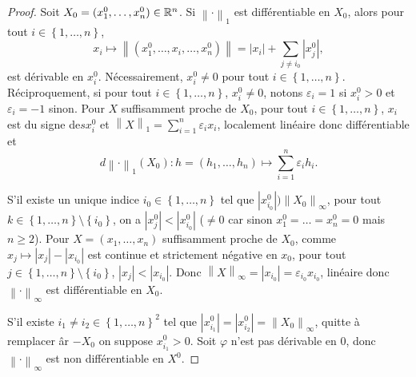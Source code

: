 \documentclass[12pt]{article}
\begin{document}
\begin{proof}
	Soit $X_0=(x_{1}^{0},\dots,x_{n}^{0})\in\mathbb{R}^{n}$. Si $\left\lVert\cdot\right\rVert_{1}$ est différentiable en $X_0$, alors pour tout $i\in\left\lbrace1,\dots,n\right\rbrace$, 
	\begin{equation}
		x_i\mapsto \left\lVert(x_1^{0},\dots,x_i,\dots,x_n^{0})\right\rVert=\left\lvert x_i\right\rvert+\sum_{j\neq i_0}\left\lvert x_j^{0}\right\rvert,
	\end{equation}
	est dérivable en $x_{i}^{0}$. Nécessairement, $x_{i}^{0}\neq0$ pour tout $i\in\left\lbrace1,\dots,n\right\rbrace$.
	Réciproquement, si pour tout $i\in\left\lbrace1,\dots,n\right\rbrace$, $x_{i}^{0}\neq0$, notons $\varepsilon_{i}=1$ si $x_i^{0}>0$ et $\varepsilon_i=-1$ sinon. Pour $X$ suffisamment proche de $X_0$, pour tout $i\in\left\lbrace1,\dots,n\right\rbrace$, $x_i$ est du signe de$ sx_{i}^{0}$ et $\left\lVert X\right\rVert_{1}=\sum_{i=1}^{n}\varepsilon_{i}x_{i}$, localement linéaire donc différentiable et 
	\begin{equation}
		d\left\lVert \cdot\right\rVert_{1}(X_0)\colon h=(h_1,\dots,h_n)\mapsto\sum_{i=1}^{n}\varepsilon_{i}h_i.
	\end{equation}

	S'il existe un unique indice $i_{0}\in\left\lbrace 1,\dots,n\right\rbrace$ tel que $\left\lvert x_{i_{0}}^{0}\right\rvert)\left\lVert X_0\right\rVert_{\infty}$, pour tout $k\in\left\lbrace1,\dots,n\right\rbrace\setminus\left\lbrace i_0\right\rbrace$, on a $\left\lvert x_j^{0}\right\rvert<\left\lvert x_{i_0}^{0}\right\rvert$ ($\neq0$ car sinon $x_1^{0}=\dots=x_n^{0}=0$ mais $n\geqslant2$). Pour $X=(x_1,\dots,x_n)$ suffisamment proche de $X_0$, comme $x_j\mapsto\left\lvert x_j\right\rvert-\left\lvert x_{i_{0}}\right\rvert$ est continue et strictement négative en $x_{0}$, pour tout $j\in\left\lbrace1,\dots,n\right\rbrace\setminus\left\lbrace i_0\right\rbrace$, $\left\lvert x_j\right\rvert<\left\lvert x_{i_0}\right\rvert$. Donc $\left\lVert X\right\rVert_{\infty}=\left\lvert x_{i_0}\right\rvert=\varepsilon_{i_0}x_{i_0}$, linéaire donc $\left\lVert \cdot\right\rVert_{\infty}$ est différentiable en $X_0$.

	S'il existe $i_1\neq i_2\in\left\lbrace 1,\dots,n\right\rbrace^{2}$ tel que $\left\lvert x_{i_{1}}^{0}\right\rvert=\left\lvert x_{i_{2}}^{0}\right\rvert=\left\lVert X_{0}\right\rVert_{\infty}$, quitte à remplacer âr $-X_0$ on suppose $x_{i_{1}}^{0}>0$. Soit 
	$\varphi$ n'est pas dérivable en 0, donc $\left\lVert\cdot\right\rVert_{\infty}$ est non différentiable en $X^{0}$.
\end{proof}
\end{document}
